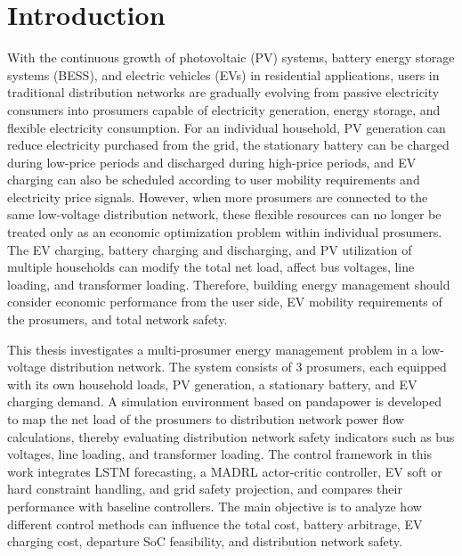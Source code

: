 
\chapter{Introduction}\label{chapter:introduction}

With the continuous growth of photovoltaic (PV) systems, battery energy storage systems (BESS), and electric vehicles (EVs) in residential applications, users in traditional distribution networks are gradually evolving from passive electricity consumers into prosumers capable of electricity generation, energy storage, and flexible electricity consumption. For an individual household, PV generation can reduce electricity purchased from the grid, the stationary battery can be charged during low-price periods and discharged during high-price periods, and EV charging can also be scheduled according to user mobility requirements and electricity price signals. However, when more prosumers are connected to the same low-voltage distribution network, these flexible resources can no longer be treated only as an economic optimization problem within individual prosumers. The EV charging, battery charging and discharging, and PV utilization of multiple households can modify the total net load, affect bus voltages, line loading, and transformer loading. Therefore, building energy management should  consider economic performance from the user side, EV mobility requirements of the prosumers, and total network safety.

This thesis investigates a multi-prosumer energy management problem in a low-voltage distribution network. The system consists of 3 prosumers, each equipped with its own household loads, PV generation, a stationary battery, and EV charging demand. A simulation environment based on pandapower is developed to map the net load of the prosumers to distribution network power flow calculations, thereby evaluating distribution network safety indicators such as bus voltages, line loading, and transformer loading. The control framework in this work integrates LSTM forecasting, a MADRL actor-critic controller, EV soft or hard constraint handling, and grid safety projection, and compares their performance with baseline controllers. The main objective is to analyze how different control methods can influence the total cost, battery arbitrage, EV charging cost, departure SoC feasibility, and distribution network safety.

